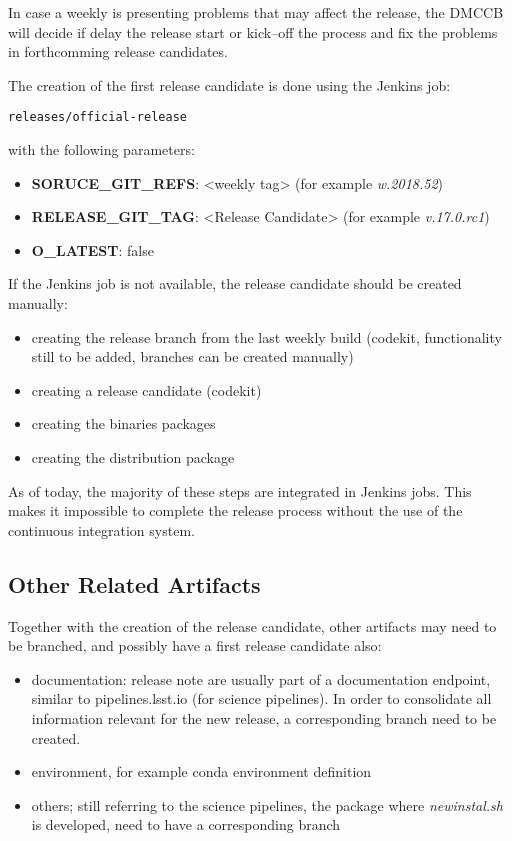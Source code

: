 In case a weekly is presenting problems that may affect the release, the DMCCB will decide if delay the release start or kick--off the process and fix the problems in forthcomming release candidates.

The creation of the first release candidate is done using the Jenkins job:

\begin{verbatim}
releases/official-release 
\end{verbatim}

with the following parameters:

\begin{itemize}
\item {\bf SORUCE\_GIT\_REFS}: <weekly tag> (for example \textit{w.2018.52})
\item {\bf RELEASE\_GIT\_TAG}: <Release Candidate> (for example \textit{v.17.0.rc1})
\item {\bf O\_LATEST}: false
\end{itemize}


If the Jenkins job is not available, the release candidate should be created manually:

\begin{itemize}
\item creating the release branch from the last weekly build (codekit, functionality still to be added, branches can be created manually)
\item creating a release candidate (codekit)
\item creating the binaries packages 
\item creating the distribution package
\end{itemize}

As of today, the majority of these steps are integrated in Jenkins jobs. This makes it impossible to complete the release process without the use of the continuous integration system.

\subsection{Other Related Artifacts}

Together with the creation of the release candidate, other artifacts may need to be branched, and possibly have a first release candidate also:

\begin{itemize}
\item documentation: release note are usually part of a documentation endpoint, similar to pipelines.lsst.io (for science pipelines). In order to consolidate all information relevant for the new release, a corresponding branch need to be created.
\item environment, for example conda environment definition
\item others; still referring to the science pipelines, the package where \textit{newinstal.sh} is developed, need to have a corresponding branch
\end{itemize}



